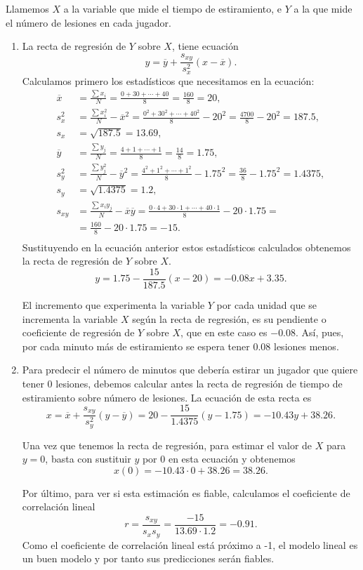 {Llamemos $X$ a la variable que mide el tiempo de estiramiento, e $Y$ a la que
mide el número de lesiones en cada jugador.
\begin{enumerate}
\item La recta de regresión de $Y$ sobre $X$, tiene ecuación
\[
y=\overline{y}+\frac{s_{xy}}{s_{x}^2}(x-\overline{x}).
\]
Calculamos primero los estadísticos que necesitamos en la ecuación:
\begin{align*}
\overline{x} & = \frac{\sum x_{i}}{N}=\frac{0+30+\cdots+40}{8}=\frac{160}{8}=20,  \\
s_{x}^2 & = \frac{\sum x_{i}^2}{N}-\overline{x}^2 =
\frac{0^2+30^2+\cdots+40^2}{8}-20^2=\frac{4700}{8}-20^2=187.5,  \\
s_{x} & = \sqrt{187.5}=13.69,  \\
\overline{y} & = \frac{\sum y_{j}}{N}=\frac{4+1+\cdots+1}{8}=
\frac{14}{8}=1.75,  \\
s_{y}^2 & = \frac{\sum y_{j}^2}{N}-\overline{y}^2 =
\frac{4^2+1^2+\cdots+1^2}{8}-1.75^2=\frac{36}{8}-1.75^2=1.4375,  \\
s_{y} & = \sqrt{1.4375}=1.2,  \\
s_{xy} & = \frac{\sum x_{i}y_{j}}{N}-\overline{x}\overline{y} =
\frac{0\cdot 4+30\cdot 1+\cdots +40\cdot 1}{8}
-20\cdot 1.75 =\\
& = \frac{160}{8}-20\cdot 1.75=-15.  \\
\end{align*}
Sustituyendo en la ecuación anterior estos estadísticos calculados obtenemos la
recta de regresión de $Y$ sobre $X$.
\[
y=1.75-\frac{15}{187.5}(x-20)=-0.08x+3.35.
\]

El incremento que experimenta la variable $Y$ por cada unidad que se
incrementa la variable $X$ según la recta de regresión, es su pendiente o
coeficiente de regresión de $Y$ sobre $X$, que en este caso es $-0.08$. Así,
pues, por cada minuto más de estiramiento se espera tener $0.08$ lesiones
menos.

\item Para predecir el número de minutos que debería estirar un jugador que
quiere tener 0 lesiones, debemos calcular antes la recta de regresión de
tiempo de estiramiento sobre número de lesiones. La ecuación de esta recta
es
\[
x=\overline{x}+\frac{s_{xy}}{s_{y}^2}(y-\overline{y})=
20-\frac{15}{1.4375}(y-1.75)=-10.43y+38.26.
\]

Una vez que tenemos la recta de regresión, para estimar el valor de $X$ para $y=0$, basta con sustituir $y$ por $0$ en esta ecuación y
obtenemos \[ x(0)=-10.43\cdot 0+38.26=38.26. \]

Por último, para ver si esta estimación es fiable, calculamos el coeficiente de
correlación lineal
\[
r=\frac{s_{xy}}{s_{x}s_{y}}=\frac{-15}{13.69\cdot 1.2}=-0.91.
\]
Como el coeficiente de correlación lineal está próximo a -1, el modelo lineal es un
buen modelo y por tanto sus predicciones serán fiables.
\end{enumerate}
}



